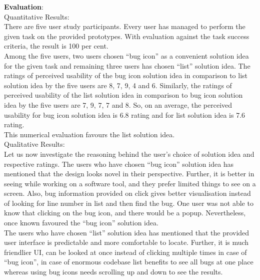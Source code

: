 \clearpage

\textbf{Evaluation}: \\

Quantitative Results: \\

There are five user study participants. Every user has managed to perform the given task on the provided prototypes. With evaluation against the task success criteria, the result is 100 per cent. \\

Among the five users, two users chosen “bug icon” as a convenient solution idea for the given task and remaining three users has chosen “list” solution idea. The ratings of perceived usability of the bug icon solution idea in comparison to list solution idea by the five users are 8, 7, 9, 4 and 6. Similarly, the ratings of perceived usability of the list solution idea in comparison to bug icon solution idea by the five users are 7, 9, 7, 7 and 8. So, on an average, the perceived usability for bug icon solution idea is 6.8 rating and for list solution idea is 7.6 rating. \\

This numerical evaluation favours the list solution idea. \\

Qualitative Results: \\

Let us now investigate the reasoning behind the user’s choice of solution idea and respective ratings. The users who have chosen “bug icon” solution idea has mentioned that the design looks novel in their perspective. Further, it is better in seeing while working on a software tool, and they prefer limited things to see on a screen. Also, bug information provided on click gives better visualisation instead of looking for line number in list and then find the bug. One user was not able to know that clicking on the bug icon, and there would be a popup. Nevertheless, once known favoured the “bug icon” solution idea. \\

The users who have chosen “list” solution idea has mentioned that the provided user interface is predictable and more comfortable to locate. Further, it is much friendlier UI, can be looked at once instead of clicking multiple times in case of “bug icon”, in case of enormous codebase list benefits to see all bugs at one place whereas using bug icons needs scrolling up and down to see the results. \\


